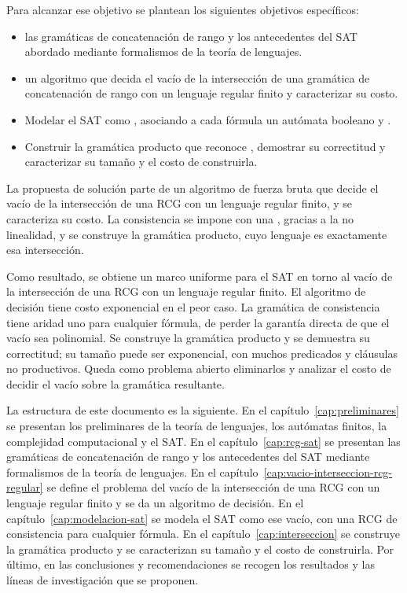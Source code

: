 \documentclass{report}
\begin{document}
Para alcanzar ese objetivo  se plantean los siguientes objetivos
específicos:
\begin{itemize}
  \item {} las gramáticas de concatenación de rango y los
    antecedentes del SAT abordado mediante formalismos de la teoría de
    lenguajes.
  \item {} un algoritmo que decida el vacío de la intersección de una
    gramática de concatenación de rango con un lenguaje regular finito y
    caracterizar su costo.
      \item Modelar el SAT como , asociando a
    cada fórmula un autómata booleano y .
      \item Construir la gramática producto que reconoce , demostrar su correctitud y caracterizar
    su tamaño y el costo de construirla.
\end{itemize}

La propuesta de solución parte de un algoritmo de fuerza bruta que decide el
vacío de la intersección de una RCG con un lenguaje regular finito, y se
caracteriza su costo. La consistencia se impone con una , gracias a la no linealidad, y se construye
la gramática producto, cuyo lenguaje es exactamente esa intersección.

Como resultado, se obtiene un marco uniforme para el SAT en torno al vacío de la
intersección de una RCG con un lenguaje regular finito. El algoritmo de decisión
tiene costo exponencial en el peor caso. La gramática de consistencia tiene
aridad uno para cualquier fórmula,  de perder la garantía directa de que
el vacío sea polinomial. Se construye la gramática producto y se demuestra su
correctitud; su tamaño puede ser exponencial, con muchos predicados y cláusulas
no productivos.  Queda como problema abierto eliminarlos y analizar el costo de
decidir el vacío sobre la gramática resultante.

La estructura de este documento es la siguiente. En el
capítulo~\ref{cap:preliminares} se presentan los preliminares de la
teoría de lenguajes, los autómatas finitos, la complejidad computacional
y el SAT. En el capítulo~\ref{cap:rcg-sat} se presentan las gramáticas de
concatenación de rango y los antecedentes del SAT mediante formalismos de
la teoría de lenguajes. En el capítulo~\ref{cap:vacio-interseccion-rcg-regular}
se define el problema del vacío de la intersección de una RCG con un
lenguaje regular finito y se da un algoritmo de decisión. En el
capítulo~\ref{cap:modelacion-sat} se modela el SAT como ese vacío, con una
RCG de consistencia para cualquier fórmula. En el
capítulo~\ref{cap:interseccion} se construye la gramática producto y se
caracterizan su tamaño y el costo de construirla. Por último, en las
conclusiones y recomendaciones se recogen los resultados y las líneas de
investigación que se proponen.



\end{document}
